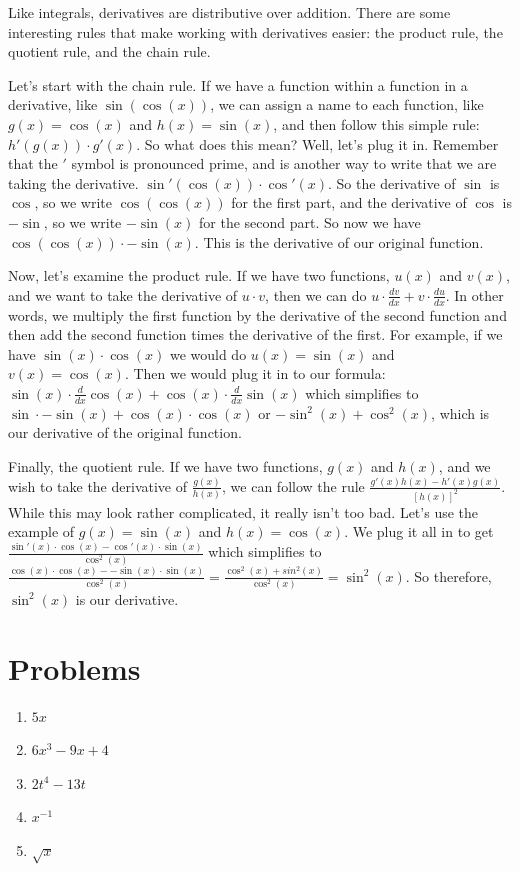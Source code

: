 \documentclass[12pt]{article}
\begin{document}
Like integrals, derivatives are distributive over addition. There are some interesting rules that make working with derivatives easier: the product rule, the quotient rule, and the chain rule. 

Let's start with the chain rule. If we have a function within a function in a derivative, like $\sin(\cos(x))$, we can assign a name to each function, like $g(x) = \cos(x)$ and $h(x) = \sin(x)$, and then follow this simple rule: $h'(g(x)) \cdot g'(x)$. So what does this mean? Well, let's plug it in. Remember that the $'$ symbol is pronounced prime, and is another way to write that we are taking the derivative. $\sin'(\cos(x)) \cdot \cos'(x)$. So the derivative of $\sin$ is $\cos$, so we write $\cos(\cos(x))$ for the first part, and the derivative of $\cos$ is $-\sin$, so we write $-\sin(x)$ for the second part. So now we have $\cos(\cos(x)) \cdot -\sin(x)$. This is the derivative of our original function.

Now, let's examine the product rule. If we have two functions, $u(x)$ and $v(x)$, and we want to take the derivative of $u\cdot v$, then we can do $u \cdot \frac{dv}{dx}+ v\cdot\frac{du}{dx}$. In other words, we multiply the first function by the derivative of the second function and then add the second function times the derivative of the first. For example, if we have $\sin(x)\cdot\cos(x)$ we would do $u(x) = \sin(x)$ and $v(x) = \cos(x)$. Then we would plug it in to our formula: $\sin(x)\cdot\frac{d}{dx}\cos(x) + \cos(x)\cdot\frac{d}{dx}\sin(x)$ which simplifies to $\sin\cdot -\sin(x) + \cos(x)\cdot\cos(x)$ or $-\sin^2(x)+\cos^2(x)$, which is our derivative of the original function.

Finally, the quotient rule. If we have two functions, $g(x)$ and $h(x)$, and we wish to take the derivative of $\frac{g(x)}{h(x)}$, we can follow the rule $\frac{g'(x)h(x)-h'(x)g(x)}{[h(x)]^2}$. While this may look rather complicated, it really isn't too bad. Let's use the example of $g(x) = \sin(x)$ and $h(x) = \cos(x)$. We plug it all in to get $\frac{\sin'(x)\cdot\cos(x) -\cos'(x)\cdot\sin(x)}{\cos^2(x)}$
which simplifies to $\frac{\cos(x)\cdot\cos(x)--\sin(x)\cdot\sin(x)}{\cos^2(x)} = \frac{\cos^2(x)+sin^2(x)}{\cos^2(x)} = \sin^2(x)$. So therefore, $\sin^2(x)$ is our derivative.
\section{Problems}
\begin{enumerate}
    \item $5x$
    \item $6x^3 - 9x + 4$
    \item $2t^4 - 13t$
    \item $x^{-1}$
    \item $\sqrt{x}$
\end{enumerate}
\end{document}
